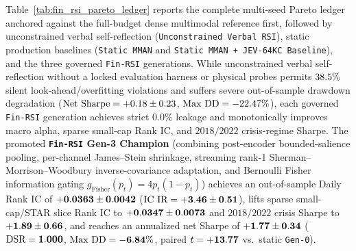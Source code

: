 Table~\ref{tab:fin_rsi_pareto_ledger} reports the complete multi-seed Pareto ledger anchored
against the full-budget dense multimodal reference first, followed by unconstrained verbal
self-reflection (\texttt{Unconstrained Verbal RSI}), static production baselines (\texttt{Static MMAN}
and \texttt{Static MMAN + JEV-64KC Baseline}), and the three governed \texttt{Fin-RSI} generations.
While unconstrained verbal self-reflection without a locked evaluation harness or physical probes
permits $38.5{}\%$ silent look-ahead/overfitting violations and suffers severe
out-of-sample drawdown degradation ($\text{Net Sharpe} = +0.18{} \pm 0.23{}$,
$\text{Max DD} = -22.47{}\%$), each governed \texttt{Fin-RSI} generation achieves
strict $0.0\%$ leakage and monotonically improves macro alpha, sparse small-cap Rank IC, and
$2018/2022$ crisis-regime Sharpe. The promoted \textbf{\texttt{Fin-RSI} Gen-3 Champion}
(combining post-encoder bounded-salience pooling, per-channel James--Stein shrinkage, streaming
rank-1 Sherman--Morrison--Woodbury inverse-covariance adaptation, and Bernoulli Fisher information
gating $g_{\text{Fisher}}(p_t) = 4p_t(1-p_t)$) achieves an out-of-sample Daily Rank IC of
$\mathbf{+0.0363{} \pm 0.0042{}}$ ($\text{IC IR} = \mathbf{+3.46{} \pm 0.51{}}$),
lifts sparse small-cap/STAR slice Rank IC to $\mathbf{+0.0347{} \pm 0.0073{}}$
and $2018/2022$ crisis Sharpe to $\mathbf{+1.89{} \pm 0.66{}}$,
and reaches an annualized net Sharpe of $\mathbf{+1.77{} \pm 0.34{}}$
($\text{DSR} = \mathbf{1.000{}}$, $\text{Max DD} = \mathbf{-6.84{}\%}$,
paired $t = \mathbf{+13.77{}}$ vs.\ static \texttt{Gen-0}).

